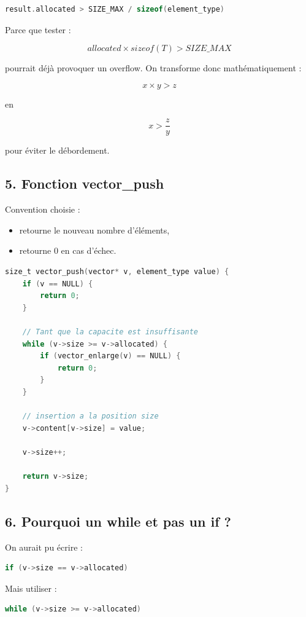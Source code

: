 \begin{lstlisting}[language=C]
result.allocated > SIZE_MAX / sizeof(element_type)
\end{lstlisting}

Parce que tester :

\[
allocated \times sizeof(T) > SIZE\_MAX
\]

pourrait déjà provoquer un overflow.
On transforme donc mathématiquement :

\[
x \times y > z
\]

en

\[
x > \frac{z}{y}
\]

pour éviter le débordement.

\subsection{5. Fonction vector\_push}

Convention choisie :
\begin{itemize}
    \item retourne le nouveau nombre d’éléments,
    \item retourne 0 en cas d’échec.
\end{itemize}

\begin{lstlisting}[language=C]
size_t vector_push(vector* v, element_type value) {
    if (v == NULL) {
        return 0;
    }

    // Tant que la capacite est insuffisante
    while (v->size >= v->allocated) {
        if (vector_enlarge(v) == NULL) {
            return 0;
        }
    }

    // insertion a la position size
    v->content[v->size] = value;

    v->size++;

    return v->size;
}
\end{lstlisting}

\subsection{6. Pourquoi un while et pas un if ?}

On aurait pu écrire :

\begin{lstlisting}[language=C]
if (v->size == v->allocated)
\end{lstlisting}

Mais utiliser :

\begin{lstlisting}[language=C]
while (v->size >= v->allocated)
\end{lstlisting}

